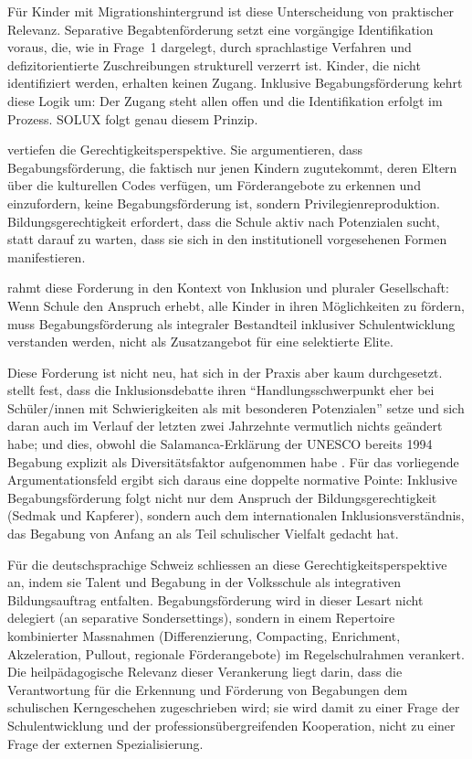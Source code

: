 \documentclass[ngerman, a4paper]{article}
\begin{document}
Für Kinder mit Migrationshintergrund ist diese Unterscheidung von praktischer
Relevanz. Separative Begabtenförderung setzt eine vorgängige Identifikation voraus,
die, wie in Frage~1 dargelegt, durch sprachlastige Verfahren und defizitorientierte
Zuschreibungen strukturell verzerrt ist. Kinder, die nicht identifiziert werden,
erhalten keinen Zugang. Inklusive Begabungsförderung kehrt diese Logik um: Der
Zugang steht allen offen und die Identifikation erfolgt im Prozess. SOLUX folgt
genau diesem Prinzip.

\textcite{sedmak2021bildungsgerechtigkeit} vertiefen die Gerechtigkeitsperspektive. Sie argumentieren, dass
Begabungsförderung, die faktisch nur jenen Kindern zugutekommt, deren Eltern über
die kulturellen Codes verfügen, um Förderangebote zu erkennen und einzufordern, keine
Begabungsförderung ist, sondern Privilegienreproduktion. Bildungsgerechtigkeit
erfordert, dass die Schule aktiv nach Potenzialen sucht, statt darauf zu warten,
dass sie sich in den institutionell vorgesehenen Formen manifestieren.

\textcite{muelleroppliger2021plurale} rahmt diese Forderung in den Kontext von Inklusion und pluraler
Gesellschaft: Wenn Schule den Anspruch erhebt, alle Kinder in ihren Möglichkeiten
zu fördern, muss Begabungsförderung als integraler Bestandteil inklusiver
Schulentwicklung verstanden werden, nicht als Zusatzangebot für eine selektierte
Elite.

Diese Forderung ist nicht neu, hat sich in der Praxis aber kaum durchgesetzt.
\textcite[S.\,119]{baudson2021wasdenken} stellt fest, dass die Inklusionsdebatte
ihren \enquote{Handlungsschwerpunkt eher bei Schüler/innen mit Schwierigkeiten als
mit besonderen Potenzialen} setze und sich daran auch im Verlauf der letzten zwei
Jahrzehnte vermutlich nichts geändert habe; und dies, obwohl die
Salamanca-Erklärung der UNESCO bereits 1994 Begabung explizit als
Diversitätsfaktor aufgenommen habe \parencite[S.\,119]{baudson2021wasdenken}. Für
das vorliegende Argumentationsfeld ergibt sich daraus eine doppelte normative
Pointe: Inklusive Begabungsförderung folgt nicht nur dem Anspruch der
Bildungsgerechtigkeit (Sedmak und Kapferer), sondern auch dem internationalen
Inklusionsverständnis, das Begabung von Anfang an als Teil schulischer Vielfalt
gedacht hat.

Für die deutschsprachige Schweiz schliessen
\textcite[S.\,317--322]{grossenbacher2014integrative} an diese
Gerechtigkeitsperspektive an, indem sie Talent und Begabung in der Volksschule
als integrativen Bildungsauftrag entfalten. Begabungsförderung wird in dieser
Lesart nicht delegiert (an separative Sondersettings), sondern in einem
Repertoire kombinierter Massnahmen (Differenzierung, Compacting, Enrichment,
Akzeleration, Pullout, regionale Förderangebote) im Regelschulrahmen verankert.
Die heilpädagogische Relevanz dieser Verankerung liegt darin, dass die
Verantwortung für die Erkennung und Förderung von Begabungen dem schulischen
Kerngeschehen zugeschrieben wird; sie wird damit zu einer Frage der
Schulentwicklung und der professionsübergreifenden Kooperation, nicht zu einer
Frage der externen Spezialisierung.
\end{document}
